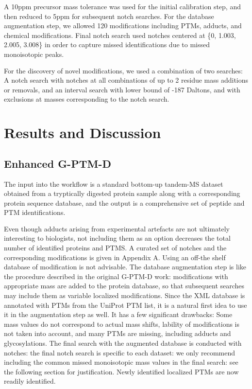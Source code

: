 \documentclass[journal=jprobs,manuscript=article]{achemso}
\begin{document}
A 10ppm precursor mass tolerance was used for the initial calibration step, and then reduced to 5ppm for subsequent notch searches. For the database augmentation step, we allowed 120 modifications including PTMs, adducts, and chemical modifications. Final notch search used notches centered at \{0, 1.003, 2.005, 3.008\} in order to capture missed identifications due to missed monoisotopic peaks.

For the discovery of novel modifications, we used a combination of two searches: A notch search with notches at all combinations of up to 2 residue mass additions or removals, and an interval search with lower bound of -187 Daltons, and with exclusions at masses corresponding to the notch search.

\section{Results and Discussion}

\subsection{Enhanced G-PTM-D}

The input into the workflow is a standard bottom-up tandem-MS dataset obtained from a tryptically digested protein sample along with a corresponding protein sequence database, and the output is a comprehensive set of peptide and PTM identifications. 

Even though adducts arising from experimental artefacts are not ultimately interesting to biologists, not including them as an option decreases the total number of identified proteins and PTMS. A curated set of notches and the corresponding modifications is given in Appendix A. Using an off-the shelf database of modification is not advisable. The database augmentation step is like the procedure described in the original G-PTM-D work: modifications with appropriate mass are added to the protein database, so that subsequent searches may include them as variable localized modifications. 
Since the XML database is annotated with PTMs from the UniProt PTM list, it is a natural first idea to use it in the augmentation step as well. It has a few significant drawbacks: Some mass values do not correspond to actual mass shifts, lability of modifications is not taken into account, and many PTMs are missing, including adducts and glycosylations.
The final search with the augmented database is conducted with notches: the final notch search is specific to each dataset: we only recommend including the common missed monoisotopic mass values in the final search: see the following section for justification. Newly identified localized PTMs are now readily identified.
\end{document}
